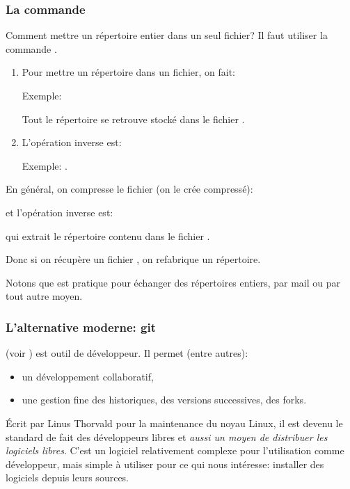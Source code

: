 \subsubsection{La commande }
Comment mettre un répertoire entier dans un seul fichier? Il faut
utiliser la commande .

\begin{enumerate}
\item Pour mettre un répertoire dans un fichier, on fait:
  

    Exemple: 

    Tout le répertoire  se retrouve stocké dans le
    fichier . 

    \item L'opération inverse est:


Exemple: .
\end{enumerate}

En général, on compresse le fichier  (on le crée compressé):

\begin{center}
\end{center}

et l'opération inverse est:

\begin{center}
\end{center}

  qui extrait le répertoire contenu dans le fichier .


Donc si on récupère un fichier , on refabrique un
répertoire.

Notons que  est pratique pour échanger des répertoires
entiers, par mail ou par tout autre moyen.
\subsubsection{L'alternative moderne: git}
 (voir \cite{git}) est outil de développeur. Il permet (entre
autres):

\begin{itemize}
\item un développement collaboratif,
\item une gestion fine des historiques, des versions successives, des
  \og forks\fg.
\end{itemize}
Écrit par Linus Thorvald pour la maintenance du noyau Linux, il est
devenu le standard de fait des développeurs \og libres\fg{} et
\emph{aussi un
moyen de distribuer les logiciels libres}. C'est un logiciel
relativement complexe pour l'utilisation comme développeur, mais
simple à utiliser  pour ce qui nous intéresse: installer des logiciels
depuis leurs sources.

